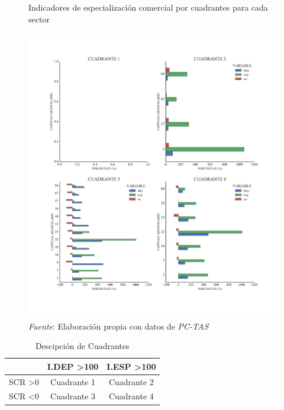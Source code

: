 \documentclass[a4paper,openright,12pt]{book}
\begin{document}
\begin{figure}[ht]
    \centering
    \caption{Indicadores de especialización comercial por cuadrantes para cada sector}
    \includegraphics[width=450px]{cuadrantes.pdf}
    \caption*{\textit{Fuente}: Elaboración propia con datos de \textit{PC-TAS}}
    \label{esp_c}
\end{figure}

\begin{table}[ht]
    \centering
    \caption{Descipción de Cuadrantes}
    \label{desc_cuadrantes}
    \begin{tabular}{@{}lcc@{}}
    \toprule
                       & I.DEP \textgreater 100 & I.ESP \textgreater 100 \\ \midrule
    SCR \textgreater 0 & Cuadrante 1      & Cuadrante 2      \\
    SCR \textless 0    & Cuadrante 3  & Cuadrante 4     \\ \bottomrule
    \end{tabular}
\end{table}
\end{document}
